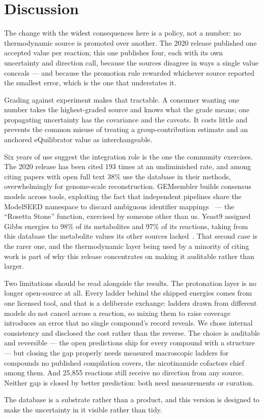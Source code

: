 \section{Discussion}

The change with the widest consequences here is a policy, not a number: no
thermodynamic source is promoted over another. The 2020 release published one
accepted value per reaction; this one publishes four, each with its own
uncertainty and direction call, because the sources disagree in ways a single
value conceals --- and because the promotion rule rewarded whichever source
reported the smallest error, which is the one that understates it.

Grading against experiment makes that tractable. A consumer wanting one number
takes the highest-graded source and knows what the grade means; one propagating
uncertainty has the covariance and the caveats. It costs little and prevents the
common misuse of treating a group-contribution estimate and an anchored
eQuilibrator value as interchangeable.

Six years of use suggest the integration role is the one the community
exercises. The 2020 release has been cited 193 times at an undiminished rate,
and among citing papers with open full text 38\% use the database in their
methods, overwhelmingly for genome-scale reconstruction. GEMsembler builds
consensus models across tools, exploiting the fact that independent pipelines
share the ModelSEED namespace to discard ambiguous identifier
mappings~\cite{gemsembler2025} --- the ``Rosetta Stone'' function, exercised by
someone other than us. Yeast9 assigned Gibbs energies to 98\% of its
metabolites and 97\% of its reactions, taking from this database the metabolite
values its other sources lacked~\cite{yeast9}. That second case is the rarer
one, and the thermodynamic layer being used by a minority of citing work is
part of why this release concentrates on making it auditable rather than
larger.

Two limitations should be read alongside the results. The protonation layer is
no longer open-source at all. Every ladder behind the shipped energies comes
from one licensed tool, and that is a deliberate exchange: ladders drawn from
different models do not cancel across a reaction, so mixing them to raise
coverage introduces an error that no single compound's record reveals. We chose
internal consistency and disclosed the cost rather than the reverse. The choice
is auditable and reversible --- the open predictions ship for every compound
with a structure --- but closing the gap properly needs measured macroscopic
ladders for compounds no published compilation covers, the nicotinamide
cofactors chief among them. And 25,855 reactions still receive no direction from
any source. Neither gap is closed by better prediction: both need measurements
or curation.

The database is a substrate rather than a product, and this version is designed
to make the uncertainty in it visible rather than tidy.
